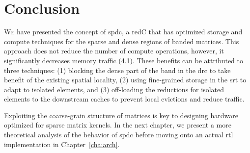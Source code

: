 
\section{Conclusion}
\label{sec:spdc:conclu}

\lettrine{W}{e} have presented the concept of \acrlong{spdc}, a \gls{redC} that has optimized storage and compute techniques for the sparse and dense regions of \gls{banded} matrices.
This approach does not reduce the number of compute operations, however, it significantly decreases memory traffic (4.1\tm).
These benefits can be attributed to three techniques: (1) blocking the dense part of the \gls{band} in the \acrshort{drc} to take benefit of the existing spatial locality, (2) using fine-grained storage in the \acrshort{srt} to adapt to isolated elements, and (3) off-loading the \glspl{reduction} for isolated elements to the downstream caches to prevent local \glspl{eviction} and reduce traffic.

Exploiting the coarse-grain structure of matrices is key to designing hardware optimized for sparse matrix kernels.
In the next chapter, we present a more theoretical analysis of the behavior of \acrlong{spdc} before moving onto an actual \acrshort{rtl} implementation in Chapter~\ref{cha:arch}.

\bigskip\bigskip


